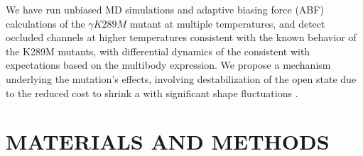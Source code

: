 \documentclass[9pt,twocolumn,twoside,lineno]{pnas-new}
\begin{document}

We have run unbiased MD simulations and adaptive biasing force (ABF) calculations of the $\gamma K289M$ mutant at multiple temperatures, and detect occluded channels at higher temperatures consistent with the known behavior of the K289M mutants, with differential dynamics of the \fivering consistent with expectations based on the multibody expression.  We propose a mechanism underlying the mutation's effects, involving destabilization of the open state due to the reduced cost to shrink a \fivering with significant shape fluctuations .   %


\section*{MATERIALS AND METHODS}
\end{document}
